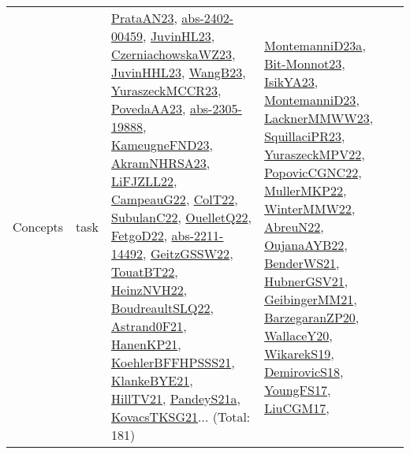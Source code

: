 {\begin{longtable}{lp{3cm}>{\raggedright}p{6cm}>{\raggedright}p{6cm}p{8cm}}
Concepts & task & \href{articles/PrataAN23.pdf}{PrataAN23}\cite{PrataAN23}, \href{articles/abs-2402-00459.pdf}{abs-2402-00459}\cite{abs-2402-00459}, \href{papers/JuvinHL23.pdf}{JuvinHL23}\cite{JuvinHL23}, \href{articles/CzerniachowskaWZ23.pdf}{CzerniachowskaWZ23}\cite{CzerniachowskaWZ23}, \href{papers/JuvinHHL23.pdf}{JuvinHHL23}\cite{JuvinHHL23}, \href{papers/WangB23.pdf}{WangB23}\cite{WangB23}, \href{articles/YuraszeckMCCR23.pdf}{YuraszeckMCCR23}\cite{YuraszeckMCCR23}, \href{papers/PovedaAA23.pdf}{PovedaAA23}\cite{PovedaAA23}, \href{articles/abs-2305-19888.pdf}{abs-2305-19888}\cite{abs-2305-19888}, \href{papers/KameugneFND23.pdf}{KameugneFND23}\cite{KameugneFND23}, \href{articles/AkramNHRSA23.pdf}{AkramNHRSA23}\cite{AkramNHRSA23}, \href{papers/LiFJZLL22.pdf}{LiFJZLL22}\cite{LiFJZLL22}, \href{articles/CampeauG22.pdf}{CampeauG22}\cite{CampeauG22}, \href{articles/ColT22.pdf}{ColT22}\cite{ColT22}, \href{articles/SubulanC22.pdf}{SubulanC22}\cite{SubulanC22}, \href{papers/OuelletQ22.pdf}{OuelletQ22}\cite{OuelletQ22}, \href{articles/FetgoD22.pdf}{FetgoD22}\cite{FetgoD22}, \href{articles/abs-2211-14492.pdf}{abs-2211-14492}\cite{abs-2211-14492}, \href{papers/GeitzGSSW22.pdf}{GeitzGSSW22}\cite{GeitzGSSW22}, \href{papers/TouatBT22.pdf}{TouatBT22}\cite{TouatBT22}, \href{articles/HeinzNVH22.pdf}{HeinzNVH22}\cite{HeinzNVH22}, \href{papers/BoudreaultSLQ22.pdf}{BoudreaultSLQ22}\cite{BoudreaultSLQ22}, \href{papers/Astrand0F21.pdf}{Astrand0F21}\cite{Astrand0F21}, \href{papers/HanenKP21.pdf}{HanenKP21}\cite{HanenKP21}, \href{articles/KoehlerBFFHPSSS21.pdf}{KoehlerBFFHPSSS21}\cite{KoehlerBFFHPSSS21}, \href{papers/KlankeBYE21.pdf}{KlankeBYE21}\cite{KlankeBYE21}, \href{papers/HillTV21.pdf}{HillTV21}\cite{HillTV21}, \href{articles/PandeyS21a.pdf}{PandeyS21a}\cite{PandeyS21a}, \href{papers/KovacsTKSG21.pdf}{KovacsTKSG21}\cite{KovacsTKSG21}... (Total: 181) & \href{articles/MontemanniD23a.pdf}{MontemanniD23a}\cite{MontemanniD23a}, \href{papers/Bit-Monnot23.pdf}{Bit-Monnot23}\cite{Bit-Monnot23}, \href{articles/IsikYA23.pdf}{IsikYA23}\cite{IsikYA23}, \href{articles/MontemanniD23.pdf}{MontemanniD23}\cite{MontemanniD23}, \href{articles/LacknerMMWW23.pdf}{LacknerMMWW23}\cite{LacknerMMWW23}, \href{papers/SquillaciPR23.pdf}{SquillaciPR23}\cite{SquillaciPR23}, \href{articles/YuraszeckMPV22.pdf}{YuraszeckMPV22}\cite{YuraszeckMPV22}, \href{papers/PopovicCGNC22.pdf}{PopovicCGNC22}\cite{PopovicCGNC22}, \href{articles/MullerMKP22.pdf}{MullerMKP22}\cite{MullerMKP22}, \href{papers/WinterMMW22.pdf}{WinterMMW22}\cite{WinterMMW22}, \href{articles/AbreuN22.pdf}{AbreuN22}\cite{AbreuN22}, \href{papers/OujanaAYB22.pdf}{OujanaAYB22}\cite{OujanaAYB22}, \href{papers/BenderWS21.pdf}{BenderWS21}\cite{BenderWS21}, \href{articles/HubnerGSV21.pdf}{HubnerGSV21}\cite{HubnerGSV21}, \href{papers/GeibingerMM21.pdf}{GeibingerMM21}\cite{GeibingerMM21}, \href{papers/BarzegaranZP20.pdf}{BarzegaranZP20}\cite{BarzegaranZP20}, \href{articles/WallaceY20.pdf}{WallaceY20}\cite{WallaceY20}, \href{articles/WikarekS19.pdf}{WikarekS19}\cite{WikarekS19}, \href{papers/DemirovicS18.pdf}{DemirovicS18}\cite{DemirovicS18}, \href{papers/YoungFS17.pdf}{YoungFS17}\cite{YoungFS17}, \href{papers/LiuCGM17.pdf}{LiuCGM17}\cite{LiuCGM17}, 
\end{longtable}}
